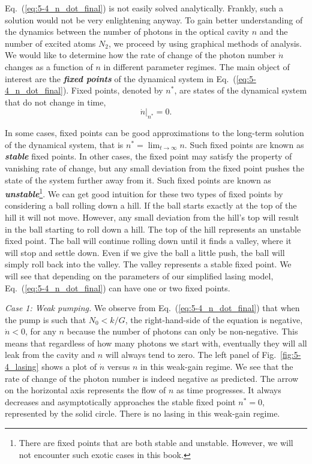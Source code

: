 Eq.~(\ref{eq:5-4_n_dot_final}) is not easily solved analytically.
Frankly, such a solution would not be very enlightening anyway.
To gain better understanding of the dynamics between the number of photons in the optical cavity $n$ and the number of excited atoms $N_2$, we proceed by using graphical methods of analysis.
We would like to determine how the rate of change of the photon number $\dot{n}$ changes as a function of $n$ in different parameter regimes.
The main object of interest are the \textbf{\emph{fixed points}} of the dynamical system in Eq.~(\ref{eq:5-4_n_dot_final}).
Fixed points, denoted by $n^*$, are states of the dynamical system that do not change in time,
\begin{equation}
    \left.\dot{n}\right|_{n^*} = 0.
\end{equation}

In some cases, fixed points can be good approximations to the long-term solution of the dynamical system, that is $n^* = \lim_{t\rightarrow\infty} n$.
Such fixed points are known as \textbf{\emph{stable}} fixed points.
In other cases, the fixed point may satisfy the property of vanishing rate of change, but any small deviation from the fixed point pushes the state of the system further away from it.
Such fixed points are known as \textbf{\emph{unstable}}\footnote{There are fixed points that are both stable and unstable. However, we will not encounter such exotic cases in this book.}.
We can get good intuition for these two types of fixed points by considering a ball rolling down a hill.
If the ball starts exactly at the top of the hill it will not move.
However, any small deviation from the hill's top will result in the ball starting to roll down a hill.
The top of the hill represents an unstable fixed point.
The ball will continue rolling down until it finds a valley, where it will stop and settle down.
Even if we give the ball a little push, the ball will simply roll back into the valley.
The valley represents a stable fixed point.
We will see that depending on the parameters of our simplified lasing model, Eq.~(\ref{eq:5-4_n_dot_final}) can have one or two fixed points.

\emph{Case 1: Weak pumping.}
We observe from Eq.~(\ref{eq:5-4_n_dot_final}) that when the pump is such that $N_0 < k / G$, the right-hand-side of the equation is negative, $\dot{n} < 0$, for any $n$ because the number of photons can only be non-negative.
This means that regardless of how many photons we start with, eventually they will all leak from the cavity and $n$ will always tend to zero.
The left panel of Fig.~\ref{fig:5-4_lasing} shows a plot of $\dot{n}$ versus $n$ in this weak-gain regime.
We see that the rate of change of the photon number is indeed negative as predicted.
The arrow on the horizontal axis represents the flow of $n$ as time progresses.
It always decreases and asymptotically approaches the stable fixed point $n^* = 0$, represented by the solid circle.
There is no lasing in this weak-gain regime.

